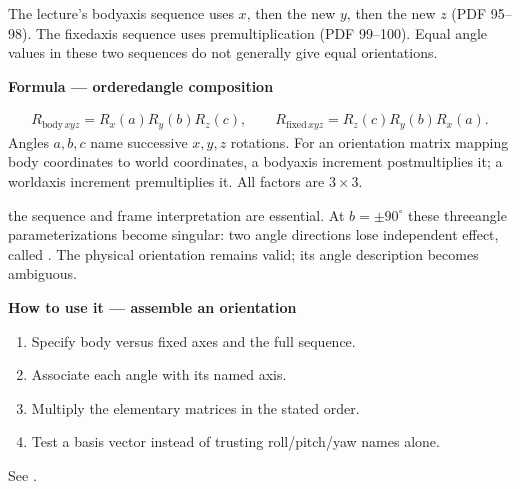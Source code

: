 \documentclass[letterpaper,11pt,english,openany,oneside]{jupyterBook}
\begin{document}
\sphinxAtStartPar
The lecture’s body\sphinxhyphen{}axis sequence uses \(x\), then the new \(y\), then the new \(z\) (PDF 95–98). The fixed\sphinxhyphen{}axis sequence uses premultiplication (PDF 99–100). Equal angle values in these two sequences do not generally give equal orientations.

\begin{TextbookBox}
\textbf{Formula — ordered\sphinxhyphen{}angle composition}\par\smallskip
\begin{equation}\label{equation:lectures/lecture01/rotations:eq-lec01-ordered-angles}
\begin{split}R_{\mathrm{body}\,xyz}=R_x(a)R_y(b)R_z(c),\qquad
R_{\mathrm{fixed}\,xyz}=R_z(c)R_y(b)R_x(a).\end{split}
\end{equation}
\sphinxAtStartPar
Angles \(a,b,c\) name successive \(x,y,z\) rotations. For an orientation matrix mapping body coordinates to world coordinates, a body\sphinxhyphen{}axis increment postmultiplies it; a world\sphinxhyphen{}axis increment premultiplies it. All factors are \(3\times3\).

\sphinxAtStartPar
{} the sequence and frame interpretation are essential. At \(b=\pm90^\circ\) these three\sphinxhyphen{}angle parameterizations become singular: two angle directions lose independent effect, called . The physical orientation remains valid; its angle description becomes ambiguous.

\end{TextbookBox}

\begin{TextbookBox}
\textbf{How to use it — assemble an orientation}\par\smallskip
\begin{enumerate}
%
\item {}
\sphinxAtStartPar
Specify body versus fixed axes and the full sequence.

\item {}
\sphinxAtStartPar
Associate each angle with its named axis.

\item {}
\sphinxAtStartPar
Multiply the elementary matrices in the stated order.

\item {}
\sphinxAtStartPar
Test a basis vector instead of trusting roll/pitch/yaw names alone.

\end{enumerate}

\sphinxAtStartPar
See {\hyperref[\detokenize{lectures/lecture01/rotations:ex-lec01-order}]{}}.

\end{TextbookBox}
\end{document}

